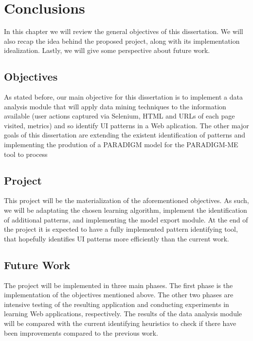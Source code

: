 \chapter{Conclusions}\label{chap:conclusions}

In this chapter we will review the general objectives of this dissertation. We will also recap the idea behind the proposed project, along with its implementation idealization. Lastly, we will give some perspective about future work.

\section{Objectives}

As stated before, our main objective for this dissertation is to implement a data analysis module that will apply data mining techniques to the information available (user actions captured via Selenium, HTML and URLs of each page visited, metrics) and so identify UI patterns in a Web aplication. The other major goals of this dissertation are extending the existent identification of patterns and implementing the prodution of a PARADIGM model for the PARADIGM-ME tool to process

\section{Project}

This project will be the materialization of the aforementioned objectives. As such, we will be adaptating the chosen learning algorithm, implement the identification of additional patterns, and implementing the model export module. At the end of the project it is expected to have a fully implemented pattern identifying tool, that hopefully identifies UI patterns more efficiently than the current work.

\section{Future Work}

The project will be implemented in three main phases. The first phase is the implementation of the objectives mentioned above. The other two phases are intensive testing of the resulting application and conducting experiments in learning Web applications, respectively. The results of the data analysis module will be compared with the current identifying heuristics to check if there have been improvements compared to the previous work.
